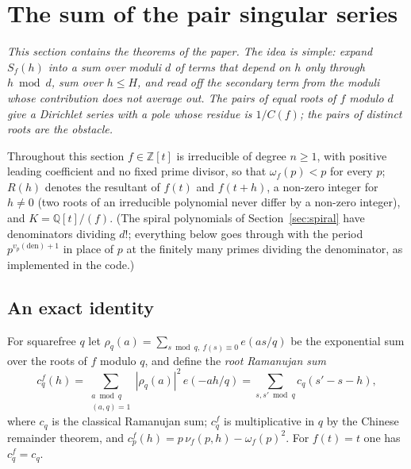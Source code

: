 \documentclass[11pt,a4paper]{article}
\theoremstyle{remark}\newtheorem{remark}[theorem]{Remark}
\newcommand{\Z}{\mathbb{Z}}
\newcommand{\Q}{\mathbb{Q}}
\begin{document}
\section{The sum of the pair singular series}\label{sec:sum}

\emph{This section contains the theorems of the paper. The idea is simple: expand $S_f(h)$ into a sum
over moduli $d$ of terms that depend on $h$ only through $h\bmod d$, sum over $h\le H$, and read off the
secondary term from the moduli whose contribution does not average out. The pairs of equal roots of $f$
modulo $d$ give a Dirichlet series with a pole whose residue is $1/C(f)$; the pairs of distinct roots
are the obstacle.}

Throughout this section $f\in\Z[t]$ is irreducible of degree $n\ge1$, with positive leading
coefficient and no fixed prime divisor, so that $\omega_f(p)<p$ for every $p$; $R(h)$ denotes the
resultant of $f(t)$ and $f(t+h)$, a non-zero integer for $h\ne0$ (two roots of an irreducible
polynomial never differ by a non-zero integer), and $K=\Q[t]/(f)$. (The spiral polynomials of
Section~\ref{sec:spiral} have denominators dividing $d!$; everything below goes through with the
period $p^{v_p(\mathrm{den})+1}$ in place of $p$ at the finitely many primes dividing the denominator,
as implemented in the code.)

\subsection{An exact identity}\label{sec:heur}

For squarefree $q$ let $\rho_q(a)=\sum_{s\bmod q,\ f(s)\equiv0}e(as/q)$ be the exponential sum over the
roots of $f$ modulo $q$, and define the \emph{root Ramanujan sum}
\[
c^f_q(h)=\sum_{\substack{a\bmod q\\(a,q)=1}}|\rho_q(a)|^2\,e(-ah/q)=\sum_{s,s'\bmod q}c_q(s'-s-h),
\]
where $c_q$ is the classical Ramanujan sum; $c^f_q$ is multiplicative in $q$ by the Chinese remainder
theorem, and $c^f_p(h)=p\,\nu_f(p,h)-\omega_f(p)^2$. For $f(t)=t$ one has $c^f_q=c_q$.
\end{document}
